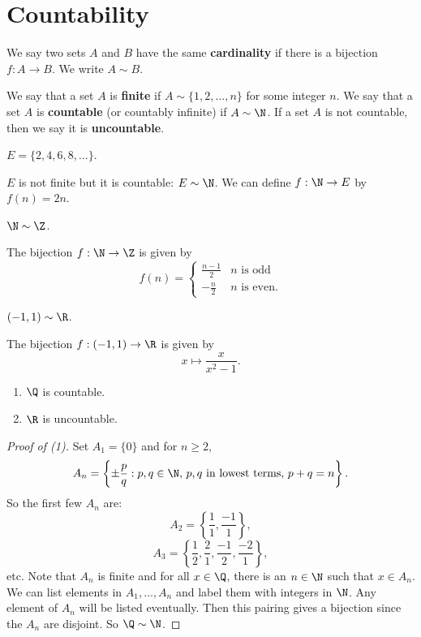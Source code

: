 \section{Countability}
\begin{definition}
  We say two sets $A$ and $B$ have the same
  \textbf{cardinality}
  if there is a bijection $f : A \to B$.
  We write $A \sim B$.
\end{definition}

\begin{definition}
  We say that a set $A$  is \textbf{finite} if
  $A \sim \{1, 2, \dots, n\}$ for some integer $n$.
  We say that a set $A$ is \textbf{countable}
  (or countably infinite) if
  $A \sim \N$.
  If a set $A$ is not countable, then we say it is
  \textbf{uncountable}.
\end{definition}

\begin{tcolorbox}
  $E = \{2, 4, 6, 8, \dots\}$.

  $E$ is not finite but it is countable: $E \sim \N$.
  We can define $f : \N \to E$ by $f(n) = 2n$.
\end{tcolorbox}

\begin{tcolorbox}
  $\N \sim \Z$. 

  The bijection $f : \N \to \Z$ is given by
  \[
  f(n) =
  \begin{cases}
    \frac{n-1}{2} & \text{$n$ is odd} \\
    -\frac{n}{2} & \text{$n$ is even}.
  \end{cases}
  \]
\end{tcolorbox}

\begin{tcolorbox}
  $(-1, 1) \sim \R$.

  The bijection  $f : (-1, 1) \to \R$ is given by
  \[x \mapsto \frac{x}{x^2 - 1}.\]
\end{tcolorbox}

\begin{theorem}\leavevmode
  \begin{enumerate}
    \item $\Q$ is countable.
    \item  $\R$ is uncountable.
  \end{enumerate}
\end{theorem}

\begin{proof}[Proof of (1)]
  Set $A_1 = \{0\}$ and for $n \ge 2$,
  \[A_n = \left\{\pm \frac{p}{q} : p, q \in \N,\, \text{$p, q$ in lowest terms},\, p + q = n\right\}.\]
  So the first few $A_n$ are:
  \[A_2 = \left\{\frac{1}{1}, \frac{-1}{1}\right\},\]
  \[A_3 = \left\{\frac{1}{2}, \frac{2}{1}, \frac{-1}{2}, \frac{-2}{1}\right\},\]
  etc. Note that $A_n$ is finite and
  for all
  $x \in \Q$, there is an $n \in \N$ such that
  $x \in A_n$.
  We can list elements in $A_1, \dots, A_n$ and label
  them with
  integers in $\N$. Any element of $A_n$ will be
  listed eventually. Then this pairing gives
  a bijection since the $A_n$ are disjoint.
  So $\Q \sim \N$.
\end{proof}

